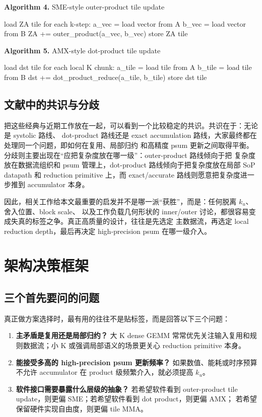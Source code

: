 \documentclass[UTF8,11pt,a4paper]{ctexart}
\newcommand{\ku}{\ensuremath{k_u}}
\begin{document}
\noindent\textbf{Algorithm 4.} SME-style outer-product tile update
\begin{code}
load ZA tile
for each k-step:
  a_vec = load vector from A
  b_vec = load vector from B
  ZA += outer_product(a_vec, b_vec)
store ZA tile
\end{code}

\noindent\textbf{Algorithm 5.} AMX-style dot-product tile update
\begin{code}
load dst tile
for each local K chunk:
  a_tile = load tile from A
  b_tile = load tile from B
  dst += dot_product_reduce(a_tile, b_tile)
store dst tile
\end{code}

\subsection{文献中的共识与分歧}

把这些经典与近期工作放在一起，可以看到一个比较稳定的共识。共识在于：无论是 systolic 路线、
dot-product 路线还是 exact accumulation 路线，大家最终都在处理同一个问题，即如何在复用、局部归约
和高精度 psum 更新之间取得平衡。分歧则主要出现在“应把复杂度放在哪一级”：outer-product 路线倾向于把
复杂度放在数据流组织和 psum 管理上，dot-product 路线倾向于把复杂度放在局部 SoP datapath 和 reduction
primitive 上，而 exact/accurate 路线则愿意把复杂度进一步推到 accumulator 本身。

因此，相关工作给本文最重要的启发并不是哪一派“获胜”，而是：任何脱离 \ku{}、舍入位置、block scale、
以及工作负载几何形状的 inner/outer 讨论，都很容易变成失真的标签之争。真正高质量的设计，往往是先选定
主数据流，再选定 local reduction depth，最后再决定 high-precision psum 在哪一级介入。

\section{架构决策框架}

\subsection{三个首先要问的问题}

真正做方案选择时，最有用的往往不是贴标签，而是回答以下三个问题：

\begin{enumerate}
  \item \textbf{主矛盾是复用还是局部归约？}
  大 K dense GEMM 常常优先关注输入复用和规则数据流；小 K 或强调局部语义的场景更关心 reduction primitive 本身。
  \item \textbf{能接受多高的 high-precision psum 更新频率？}
  如果数值、能耗或时序预算不允许 accumulator 在 product 级频繁介入，就必须提高 \ku{}。
  \item \textbf{软件接口需要暴露什么层级的抽象？}
  若希望软件看到 outer-product tile update，则更偏 SME；若希望软件看到 dot product，则更偏 AMX；
  若希望保留硬件实现自由度，则更偏 tile MMA。
\end{enumerate}
\end{document}
